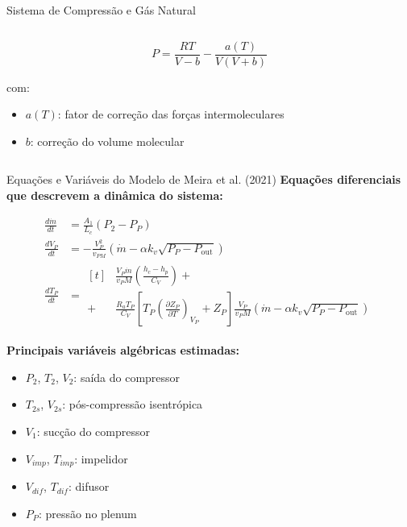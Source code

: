 \begin{frame}{Sistema de Compressão e Gás Natural}
\begin{columns}[T]
\begin{column}{0.52\textwidth}
            \[
            P = \frac{R T}{V - b} - \frac{a(T)}{V(V + b)}
            \]

            com:
            \begin{itemize}
                \item \( a(T) \): fator de correção das forças intermoleculares
                \item \( b \): correção do volume molecular
            \end{itemize}
        \end{column}
    \end{columns}
\end{frame}



\begin{frame}{Equações e Variáveis do Modelo de Meira et al. (2021)}
    \scriptsize
    \textbf{Equações diferenciais que descrevem a dinâmica do sistema:}

    \begin{multicols}{2}
    \begin{align}
        \frac{d\dot{m}}{dt} &= \frac{A_1}{L_c}(P_2 - P_P) \tag{1} \\
        \frac{dV_P}{dt} &= -\frac{V_P^2}{v_{PM}} \left( \dot{m} - \alpha k_v \sqrt{P_P - P_{\text{out}}} \right) \tag{2} \\
        \frac{dT_P}{dt} &= 
        \begin{aligned}[t]
            &\frac{V_P \dot{m}}{v_P M} \left( \frac{h_c - h_p}{C_V} \right) + \\
            + &\frac{R_a T_P}{C_V} \left[ T_P \left( \frac{\partial Z_P}{\partial T} \right)_{V_P} + Z_P \right]
            \frac{V_P}{v_P M} \left( \dot{m} - \alpha k_v \sqrt{P_P - P_{\text{out}}} \right)
        \end{aligned} \tag{3}
    \end{align}

    \columnbreak
    \begin{minipage}{\linewidth}
        \raggedleft
        \textbf{Principais variáveis algébricas estimadas:}
        \begin{itemize}
            \item \( P_2 \), \( T_2 \), \( V_2 \): saída do compressor
            \item \( T_{2s} \), \( V_{2s} \): pós-compressão isentrópica
            \item \( V_1 \): sucção do compressor
            \item \( V_{imp} \), \( T_{imp} \): impelidor
            \item \( V_{dif} \), \( T_{dif} \): difusor
            \item \( P_P \): pressão no plenum
        \end{itemize}
    \end{minipage}
    \end{multicols}


\end{frame}
